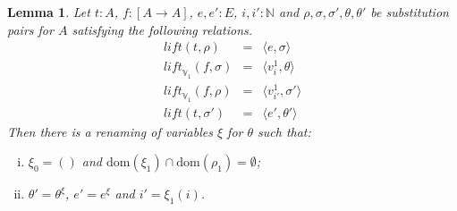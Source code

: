 \documentclass{article}
\newtheorem{lemma}[definition]{Lemma}
\newcommand{\V}{{\mathbb V}}
\newcommand{\nat}{{\mathbb N}}
\newcommand{\liftv}[1]{\ensuremath{\mathit{lift}_{\V_{#1}}}}
\newcommand{\lift}{\ensuremath{\mathit{lift}}}
\newcommand{\dom}{\ensuremath{\mathrm{dom}}}
\newcommand{\renamevar}[2]{\ensuremath{{#1}^{#2}}}
\newcommand{\isrenamevar}[3]{\ensuremath{{#1}=\renamevar{#2}{#3}}}
\newcommand{\idn}{()}
\begin{document}
\begin{lemma}\label{liftcommv1}
Let $t:A$, $f:[A\to A]$, $e,e':E$, $i,i':\nat$ and
$\rho,\sigma,\sigma',\theta,\theta'$ be substitution pairs for $A$
satisfying the following relations.
\begin{eqnarray*}
\lift(t,\rho) & = & \langle e,\sigma\rangle\\
\liftv1(f,\sigma) & = & \langle v^1_i,\theta\rangle\\
\liftv1(f,\rho) & = & \langle v^1_{i'},\sigma'\rangle\\
\lift(t,\sigma') & = & \langle e',\theta'\rangle
\end{eqnarray*}
Then there is a renaming of variables $\xi$ for $\theta$ such that:
\begin{enumerate}[(i)]
\item\label{domxi1} $\xi_0=\idn$ and
$\dom(\xi_1)\cap\dom(\rho_1)=\emptyset$;
\item\label{replxi1} {\isrenamevar{\theta'}\theta\xi},
{\isrenamevar{e'}e\xi} and $i'=\xi_1(i)$.
\end{enumerate}
\end{lemma}
\end{document}

